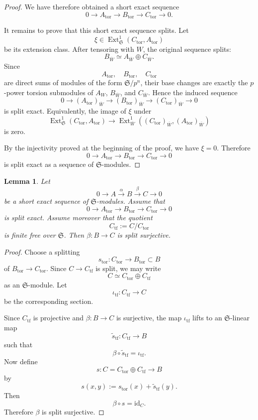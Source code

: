 \documentclass[11pt]{amsart}
\newtheorem{lemma}{Lemma}[section]
\numberwithin{equation}{section}
\newcommand{\tf}{\operatorname{tf}}
\newcommand{\tors}{\operatorname{tor}}
\newcommand{\mf}{\mathfrak}
\newcommand{\Ext}{\operatorname{Ext}}
\newcommand{\mS}{\mf{S}}
\numberwithin{equation}{section}
\newcommand{\ol}{\overline}
\begin{document}
\begin{proof}
We have therefore obtained a short exact sequence
\[
  0\to A_{\tors}
  \longrightarrow
  B_{\tors}
  \longrightarrow
  C_{\tors}
  \to 0.
\]

It remains to prove that this short exact sequence splits.  Let
\[
  \xi\in \Ext^1_{\mS}(C_{\tors},A_{\tors})
\]
be its extension class.  After tensoring with $W$, the original sequence
splits:
\[
  B_{\ol{W}}\simeq A_{\ol{W}}\oplus C_{\ol{W}}.
\]
Since
\[
  A_{\tors},\quad B_{\tors},\quad C_{\tors}
\]
are direct sums of modules of the form $\mS/p^n$, their base changes are
exactly the $p$-power torsion submodules of $A_W$, $B_{\ol{W}}$, and $C_{\ol{W}}$.
Hence the induced sequence
\[
  0\to (A_{\tors})_{\ol{W}}
  \longrightarrow
  (B_{\tors})_{\ol{W}}
  \longrightarrow
  (C_{\tors})_{\ol{W}}
  \to 0
\]
is split exact.  Equivalently, the image of $\xi$ under
\[
  \Ext^1_{\mS}(C_{\tors},A_{\tors})
  \longrightarrow
  \Ext^1_{\ol{W}}((C_{\tors})_{\ol{W}},(A_{\tors})_{\ol{W}})
\]
is zero.

By the injectivity proved at the beginning of the proof, we have $\xi=0$.
Therefore
\[
  0\to A_{\tors}
  \longrightarrow
  B_{\tors}
  \longrightarrow
  C_{\tors}
  \to 0
\]
is split exact as a sequence of $\mS$-modules.
\end{proof}


\begin{lemma}\label{glsplit}
Let
\[
  0\to A \xrightarrow{\alpha} B \xrightarrow{\beta} C\to 0
\]
be a short exact sequence of $\mS$-modules. Assume that
\[
  0\to A_{\tors}\to B_{\tors}\to C_{\tors}\to 0
\]
is split exact. Assume moreover that the quotient
\[
  C_{\tf}:=C/C_{\tors}
\]
is finite free over $\mS$. Then $\beta:B\to C$ is split surjective.
\end{lemma}

\begin{proof}
Choose a splitting
\[
  s_{\tors}:C_{\tors}\to B_{\tors}\subset B
\]
of $B_{\tors}\to C_{\tors}$. Since $C\to C_{\tf}$ is split, we may write
\[
  C\simeq C_{\tors}\oplus C_{\tf}
\]
as an $\mS$-module. Let
\[
  \iota_{\tf}:C_{\tf}\to C
\]
be the corresponding section.

Since $C_{\tf}$ is projective and $\beta:B\to C$ is surjective, the map
$\iota_{\tf}$ lifts to an $\mS$-linear map
\[
  \widetilde{s}_{\tf}:C_{\tf}\to B
\]
such that
\[
  \beta\circ \widetilde{s}_{\tf}=\iota_{\tf}.
\]
Now define
\[
  s:C=C_{\tors}\oplus C_{\tf}\longrightarrow B
\]
by
\[
  s(x,y):=s_{\tors}(x)+\widetilde{s}_{\tf}(y).
\]
Then
\[
  \beta\circ s=\mathrm{id}_C.
\]
Therefore $\beta$ is split surjective.
\end{proof}
\end{document}

